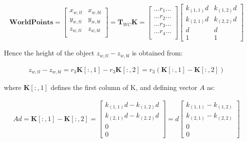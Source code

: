 \documentclass[11pt,twoside]{report}
\begin{document}
\begin{equation}
\mathbf{WorldPoints} = 
\begin{bmatrix}
x_{w,tl} &  x_{w,bl}\\
y_{w,tl} & y_{w,bl}\\
z_{w,tl} & z_{w,bl} \\
\end{bmatrix} = 
\mathbf{T}_{WC}\mathbf{K} =
\begin{bmatrix}
\dots r_{1} \dots \\
\dots r_{2} \dots \\
\dots r_{3} \dots \\
\dots r_{4} \dots \\
\end{bmatrix}
\begin{bmatrix}
k_{(1,1)}\mathit{d} & k_{(1,2)}\mathit{d}\\
k_{(2,1)}\mathit{d} & k_{(2,2)}\mathit{d}\\
\mathit{d} & \mathit{d}\\
1 & 1
\end{bmatrix} 
\label{check__depth_eq3}
\end{equation}

Hence the height of the object $z_{w,tl}-z_{w,bl}$ is obtained from:

\begin{equation}
\begin{aligned}
z_{w,tl}-z_{w,bl} = r_{3} \mathbf{K}[:,1] - r_{3} \mathbf{K}[:,2] =  r_{3} (\mathbf{K}[:,1]- \mathbf{K}[:,2])
\end{aligned}
\end{equation}

where $\mathbf{K}[:,1]$ defines the first column of K, and defining vector $A$ as:

\begin{equation}
\begin{aligned}
A\mathit{d} = \mathbf{K}[:,1]- \mathbf{K}[:,2] = 
\begin{bmatrix}
k_{(1,1)}\mathit{d} - k_{(1,2)}\mathit{d}\\
k_{(2,1)}\mathit{d} - k_{(2,2)}\mathit{d}\\
0\\
0
\end{bmatrix}
= 
\mathit{d}
\begin{bmatrix}
k_{(1,1)} - k_{(1,2)}\\
k_{(2,1)} - k_{(2,2)}\\
0\\
0
\end{bmatrix}
\end{aligned}
\end{equation}
\end{document}
